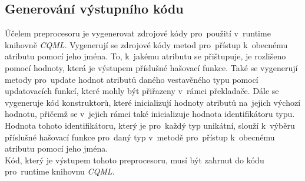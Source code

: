 \documentclass[11pt,twoside,a4paper]{book}
\begin{document}
\subsection{ Generování výstupního kódu}
Účelem preprocesoru je vygenerovat zdrojové kódy pro~použití v~runtime knihovně \textit{CQML}. Vygenerují se zdrojové kódy metod pro~přístup k~obecnému atributu pomocí jeho jména. To, k~jakému atributu se přištupuje, je rozlišeno pomocí hodnoty, která je výstupem příslušné hašovací funkce. Také se vygenerují metody pro~update hodnot atributů daného vestavěného typu pomocí updatovacích funkcí, které mohly být přiřazeny v~rámci překladače. Dále se vygeneruje kód konstruktorů, které inicializují hodnoty atributů na~jejich výchozí hodnotu, přičemž se v~jejich rámci také inicializuje hodnota identifikátoru typu. Hodnota tohoto identifikátoru, který je pro~každý typ unikátní, slouží k~výběru příslušné hašovací funkce pro~daný typ v~metodě pro~přístup k~obecnému atributu pomocí jeho jména.\\
Kód, který je výstupem tohoto preprocesoru, musí být zahrnut do kódu pro~runtime knihovnu \textit{CQML}.\\
\end{document}
